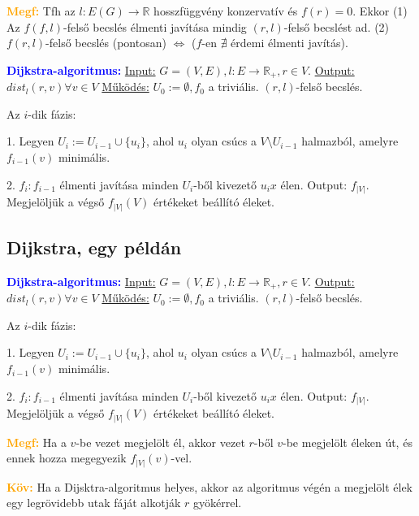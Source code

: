 \documentclass[../szamtud.tex]{subfiles}
\begin{document}
			\textbf{\textcolor{orange}{Megf:}} Tfh az $l : E(G) \rightarrow \mathbb{R}$ hosszfüggvény konzervatív és $f(r) = 0$. Ekkor (1) Az $f (f,l)$-felső becslés élmenti javítása mindig $(r,l)$-felső becslést ad. (2) $f(r,l)$-felső becslés (pontosan) $\Leftrightarrow$ ($f$-en $\nexists$ érdemi élmenti javítás).

			\textbf{\textcolor{blue}{Dijkstra-algoritmus:}} \underline{Input:} $G = (V,E), l : E \rightarrow \mathbb{R}_+, r \in V$. \underline{Output:} $dist_l(r,v) \forall v \in V$ \underline{Működés:} $U_0 := \emptyset, f_0$ a triviális. $(r,l)$-felső becslés. 
			
			Az $i$-dik fázis:

			1. Legyen $U_i := U_{i-1} \cup \{u_i\}$, ahol $u_i$ olyan csúcs a $V  \setminus  U_{i-1}$ halmazból, amelyre $f_{i-1}(v)$ minimális.

			2. $f_i:f_{i-1}$ élmenti javítása minden $U_i$-ből kivezető $u_ix$ élen. Output: $f_{|V|}$. Megjelöljük a végső $f_{|V|}(V)$ értékeket beállító éleket.
			
		\subsection{Dijkstra, egy példán}

			\textbf{\textcolor{blue}{Dijkstra-algoritmus:}} \underline{Input:} $G = (V,E), l : E \rightarrow \mathbb{R}_+, r \in V$. \underline{Output:} $dist_l(r,v) \forall v \in V$ \underline{Működés:} $U_0 := \emptyset, f_0$ a triviális. $(r,l)$-felső becslés. 
				
			Az $i$-dik fázis:

			1. Legyen $U_i := U_{i-1} \cup \{u_i\}$, ahol $u_i$ olyan csúcs a $V  \setminus  U_{i-1}$ halmazból, amelyre $f_{i-1}(v)$ minimális.

			2. $f_i:f_{i-1}$ élmenti javítása minden $U_i$-ből kivezető $u_ix$ élen. Output: $f_{|V|}$. Megjelöljük a végső $f_{|V|}(V)$ értékeket beállító éleket.
			
			\textcolor{orange}{\textbf{Megf:}} Ha a $v$-be vezet megjelölt él, akkor vezet $r$-ből $v$-be megjelölt éleken út, és ennek hozza megegyezik $f_{|V|} (v)$-vel.


			\textcolor{orange}{\textbf{Köv:}} Ha a Dijsktra-algoritmus helyes, akkor az algoritmus végén a megjelölt élek egy legrövidebb utak fáját alkotják $r$ gyökérrel.
\end{document}
